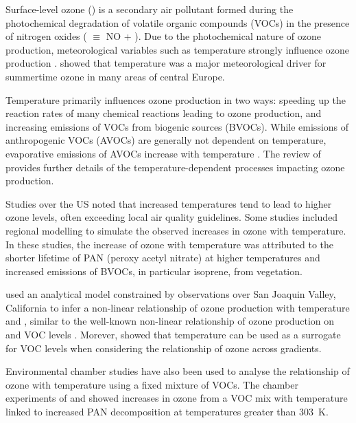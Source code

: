 Surface-level ozone () is a secondary air pollutant formed during the photochemical degradation of volatile organic compounds (VOCs) in the presence of nitrogen oxides ( $\equiv$ NO + ).
Due to the photochemical nature of ozone production, meteorological variables such as temperature strongly influence ozone production \citep{Jacob:2009}.
\citet{Otero:2016} showed that temperature was a major meteorological driver for summertime ozone in many areas of central Europe.

Temperature primarily influences ozone production in two ways: speeding up the reaction rates of many chemical reactions leading to ozone production, and increasing emissions of VOCs from biogenic sources (BVOCs).
While emissions of anthropogenic VOCs (AVOCs) are generally not dependent on temperature, evaporative emissions of AVOCs increase with temperature \citep{Rubin:2006}.
The review of \citet{Pusede:2015} provides further details of the temperature-dependent processes impacting ozone production.

Studies over the US \citep{Sillman:1995a, Dawson:2007, Pusede:2014} noted that increased temperatures tend to lead to higher ozone levels, often exceeding local air quality guidelines.
Some studies \citep{Sillman:1995a, Dawson:2007} included regional modelling to simulate the observed increases in ozone with temperature.
In these studies, the increase of ozone with temperature was attributed to the shorter lifetime of PAN (peroxy acetyl nitrate) at higher temperatures and increased emissions of BVOCs, in particular isoprene, from vegetation.

\citet{Pusede:2014} used an analytical model constrained by observations over San Joaquin Valley, California to infer a non-linear relationship of ozone production with temperature and , similar to the well-known non-linear relationship of ozone production on  and VOC levels \citep{Sillman:1999}.
Morever, \citet{Pusede:2014} showed that temperature can be used as a surrogate for VOC levels when considering the relationship of ozone across  gradients.

Environmental chamber studies have also been used to analyse the relationship of ozone with temperature using a fixed mixture of VOCs.
The chamber experiments of \citet{Carter:1979} and \citet{Hatakeyama:1991} showed increases in ozone from a VOC mix with temperature linked to increased PAN decomposition at temperatures greater than $303$~K.

